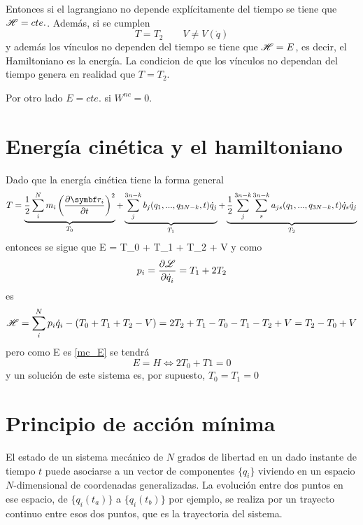 \documentclass[10pt,oneside]{CBFT_book}
\begin{document}
Entonces si el lagrangiano no depende explícitamente del tiempo se tiene que $\mathscr{H} = cte.$. Además,
si se cumplen 
\[
	T=T_2 \qquad V \neq V(\dot{q})
\]
y además los vínculos no dependen del tiempo se tiene que $\mathscr{H}=E$, es decir, el Hamiltoniano es la
energía. La condicion de que los vínculos no dependan del tiempo genera en realidad que $T=T_2$.

Por otro lado $E = cte.$ si $W^{nc} = 0$.

\section{Energía cinética y el hamiltoniano}

Dado que la energía cinética tiene la forma general
\[
	T = \underbrace{\frac{1}{2} \sum_i^N m_i \left( \dpar{\vb{r}_i}{t} \right)^2}_{T_0}  +
	\underbrace{\sum_j^{3n-k} b_j(q_1,...,q_{3N-k},t)\dot{q}_j  }_{T_1} +
	\underbrace{\frac{1}{2} \sum_j^{3n-k}\sum_s^{3n-k}  a_{js}(q_1,...,q_{3N-k},t)\dot{q}_s\dot{q}_j }_{T_2}
\]
entonces se sigue que 
\be
	E = T_0 + T_1 + T_2 + V
\label{mc_E}
\ee
y como 
\[
	p_i = \frac{\partial^{\hspace{-0.05em}} {\mathscr{L}}}{\partial {\dot{q}_i}^{\hspace{-0.05em}}} = T_1 + 2T_2 
\]
es 
\[
	\mathscr{H} = \sum_i^N p_i\dot{q}_i - (T_0 + T_1 + T_2 - V) = 2T_2 + T_1 - T_0 - T_1 - T_2 + V = T_2 - T_0 + V
\]
pero como E es \eqref{mc_E} se tendrá 
\[
	E = H \iff 2T_0 + T1 = 0
\]
y un solución de este sistema es, por supuesto, $T_0 = T_1 = 0$

\section{Principio de acción mínima}

El estado de un sistema mecánico de $ N $ grados de libertad en un dado instante de tiempo $ t $ puede asociarse a 
un vector de componentes $ \{ q_i \} $ viviendo en un espacio $N$-dimensional de coordenadas generalizadas. 
La evolución entre dos puntos en ese espacio, de $ \{ q_i(t_a) \} $  a $ \{ q_i(t_b) \} $ por ejemplo, se realiza por
un trayecto continuo entre esos dos puntos, que es la trayectoria del sistema.
\end{document}

